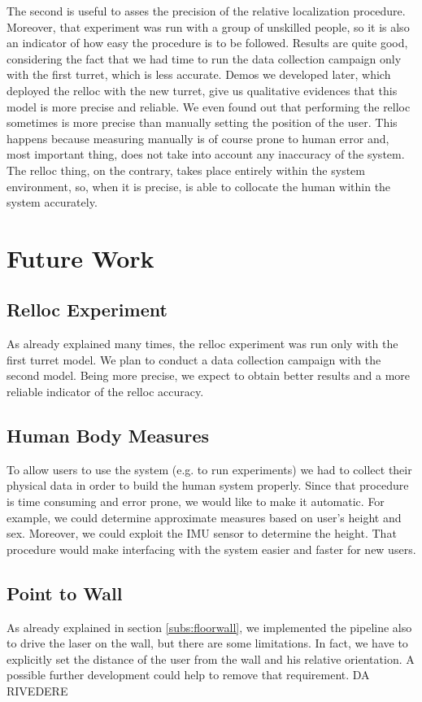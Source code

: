 The second is useful to asses the precision of the relative localization procedure. Moreover, that experiment was run with a group of unskilled people, so it is also an indicator of how easy the procedure is to be followed. Results are quite good, considering the fact that we had time to run the data collection campaign only with the first turret, which is less accurate. Demos we developed later, which deployed the relloc with the new turret, give us qualitative evidences that this model is more precise and reliable. We even found out that performing the relloc sometimes is more precise than manually setting the position of the user. This happens because measuring manually is of course prone to human error and, most important thing, does not take into account any inaccuracy of the system. The relloc thing, on the contrary, takes place entirely within the system environment, so, when it is precise, is able to collocate the human within the system accurately.

\section{Future Work}
\subsection{Relloc Experiment}
As already explained many times, the relloc experiment was run only with the first turret model. We plan to conduct a data collection campaign with the second model. Being more precise, we expect to obtain better results and a more reliable indicator of the relloc accuracy.
\subsection{Human Body Measures}
To allow users to use the system (e.g. to run experiments) we had to collect their physical data in order to build the human system properly. Since that procedure is time consuming and error prone, we would like to make it automatic. For example, we could determine approximate measures based on user's height and sex. Moreover, we could exploit the IMU sensor to determine the height. That procedure would make interfacing with the system easier and faster for new users.

\subsection{Point to Wall}
As already explained in section \ref{subs:floorwall}, we implemented the pipeline also to drive the laser on the wall, but there are some limitations. In fact, we have to explicitly set the distance of the user from the wall and his relative orientation. A possible further development could help to remove that requirement. DA RIVEDERE